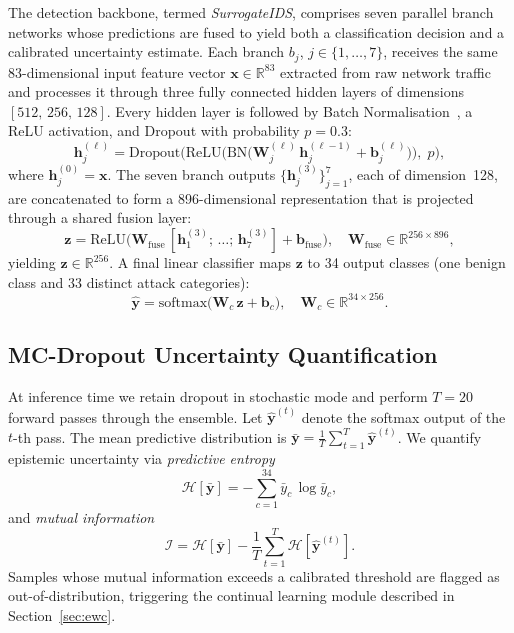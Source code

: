 The detection backbone, termed \textit{SurrogateIDS}, comprises seven
parallel branch networks whose predictions are fused to yield both a
classification decision and a calibrated uncertainty estimate.  Each branch
$b_j$, $j\in\{1,\dots,7\}$, receives the same 83-dimensional input feature
vector $\mathbf{x}\in\mathbb{R}^{83}$ extracted from raw network traffic and
processes it through three fully connected hidden layers of dimensions
$[512,\,256,\,128]$.  Every hidden layer is followed by Batch
Normalisation~\cite{ioffe2015batch}, a ReLU activation, and Dropout with
probability $p=0.3$:
\begin{equation}
  \mathbf{h}_j^{(\ell)} = \mathrm{Dropout}\!\bigl(
    \mathrm{ReLU}\!\bigl(
      \mathrm{BN}\!\bigl(
        \mathbf{W}_j^{(\ell)}\,\mathbf{h}_j^{(\ell-1)}
        + \mathbf{b}_j^{(\ell)}
      \bigr)
    \bigr),\; p
  \bigr),
  \label{eq:branch}
\end{equation}
where $\mathbf{h}_j^{(0)}=\mathbf{x}$.  The seven branch outputs
$\{\mathbf{h}_j^{(3)}\}_{j=1}^{7}$, each of dimension~128, are
concatenated to form a 896-dimensional representation that is projected
through a shared fusion layer:
\begin{equation}
  \mathbf{z} = \mathrm{ReLU}\!\bigl(
    \mathbf{W}_{\mathrm{fuse}}\,
    [\mathbf{h}_1^{(3)};\,\dots;\,\mathbf{h}_7^{(3)}]
    + \mathbf{b}_{\mathrm{fuse}}
  \bigr),\quad
  \mathbf{W}_{\mathrm{fuse}}\in\mathbb{R}^{256\times 896},
  \label{eq:fusion}
\end{equation}
yielding $\mathbf{z}\in\mathbb{R}^{256}$.  A final linear classifier maps
$\mathbf{z}$ to 34 output classes (one benign class and 33 distinct attack
categories):
\begin{equation}
  \hat{\mathbf{y}} = \mathrm{softmax}\!\bigl(
    \mathbf{W}_c\,\mathbf{z} + \mathbf{b}_c
  \bigr),\quad
  \mathbf{W}_c\in\mathbb{R}^{34\times 256}.
  \label{eq:classifier}
\end{equation}

\subsection{MC-Dropout Uncertainty Quantification}
\label{sec:mcdropout}

At inference time we retain dropout in stochastic mode and perform
$T=20$ forward passes through the ensemble.  Let
$\hat{\mathbf{y}}^{(t)}$ denote the softmax output of the $t$-th pass.
The mean predictive distribution is
$\bar{\mathbf{y}}=\frac{1}{T}\sum_{t=1}^{T}\hat{\mathbf{y}}^{(t)}$.
We quantify epistemic uncertainty via \emph{predictive entropy}
\begin{equation}
  \mathcal{H}[\bar{\mathbf{y}}]
  = -\sum_{c=1}^{34}\bar{y}_c\,\log\bar{y}_c,
  \label{eq:pred_entropy}
\end{equation}
and \emph{mutual information}
\begin{equation}
  \mathcal{I}
  = \mathcal{H}[\bar{\mathbf{y}}]
    - \frac{1}{T}\sum_{t=1}^{T}\mathcal{H}[\hat{\mathbf{y}}^{(t)}].
  \label{eq:mi}
\end{equation}
Samples whose mutual information exceeds a calibrated threshold are
flagged as out-of-distribution, triggering the continual learning module
described in Section~\ref{sec:ewc}.


